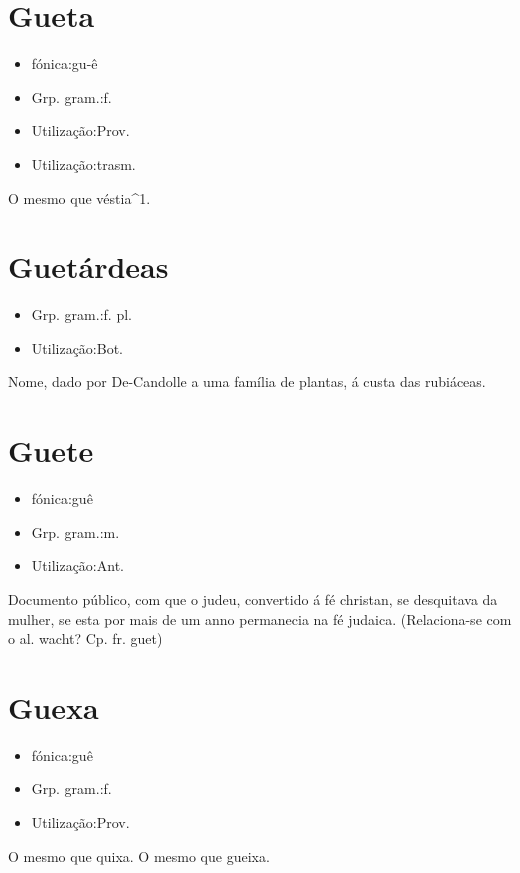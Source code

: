 \section{Gueta}
\begin{itemize}
\item {fónica:gu-ê}
\end{itemize}
\begin{itemize}
\item {Grp. gram.:f.}
\end{itemize}
\begin{itemize}
\item {Utilização:Prov.}
\end{itemize}
\begin{itemize}
\item {Utilização:trasm.}
\end{itemize}
O mesmo que \textunderscore véstia\textunderscore ^1.
\section{Guetárdeas}
\begin{itemize}
\item {Grp. gram.:f. pl.}
\end{itemize}
\begin{itemize}
\item {Utilização:Bot.}
\end{itemize}
Nome, dado por De-Candolle a uma família de plantas, á custa das rubiáceas.
\section{Guete}
\begin{itemize}
\item {fónica:guê}
\end{itemize}
\begin{itemize}
\item {Grp. gram.:m.}
\end{itemize}
\begin{itemize}
\item {Utilização:Ant.}
\end{itemize}
Documento público, com que o judeu, convertido á fé christan, se desquitava da mulher, se esta por mais de um anno permanecia na fé judaica.
(Relaciona-se com o al. \textunderscore wacht\textunderscore ? Cp. fr. \textunderscore guet\textunderscore )
\section{Guexa}
\begin{itemize}
\item {fónica:guê}
\end{itemize}
\begin{itemize}
\item {Grp. gram.:f.}
\end{itemize}
\begin{itemize}
\item {Utilização:Prov.}
\end{itemize}
O mesmo que \textunderscore quixa\textunderscore .
O mesmo que \textunderscore gueixa\textunderscore .
